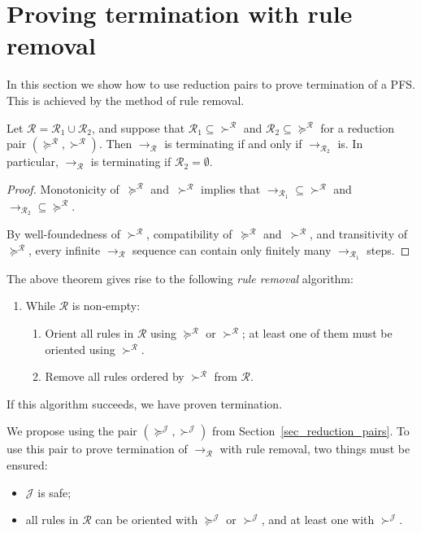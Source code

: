 \documentclass[a4paper,UKenglish,cleveref,autoref,numberwithinsect]{lipics-v2019}
\theoremstyle{definition}
\newcommand{\Rules}{\mathcal{R}}
\newcommand{\arr}[1]{\longrightarrow_{#1}}
\newcommand{\Termmap}{\mathcal{J}}
\newcommand{\succinterpret}{\succ^{\Termmap}}
\newcommand{\succeqinterpret}{\succeq^{\Termmap}}
\begin{document}
\section{Proving termination with rule removal}\label{sec_rule_removal}

In this section we show how to use reduction pairs to prove
termination of a PFS. This is achieved by the method of rule removal.

\begin{theorem}\label{thm:ruleremove}
  Let $\Rules = \Rules_1 \cup \Rules_2$, and suppose that
  $\Rules_1\subseteq{\succ^\Rules}$ and
  $\Rules_2\subseteq{\succeq^\Rules}$ for a reduction pair
  $(\succeq^\Rules,\succ^\Rules)$. Then $\arr{\Rules}$ is terminating
  if and only if $\arr{\Rules_2}$ is. In particular, $\arr{\Rules}$ is
  terminating if $\Rules_2 = \emptyset$.
\end{theorem}

\begin{proof}
  Monotonicity of~$\succeq^\Rules$ and~$\succ^\Rules$ implies that
  ${\arr{\Rules_1}}\subseteq{\succ^\Rules}$ and
  ${\arr{\Rules_2}}\subseteq{\succeq^\Rules}$.

  By well-foundedness of $\succ^\Rules$, compatibility
  of~$\succeq^\Rules$ and~$\succ^\Rules$, and transitivity
  of~$\succeq^\Rules$, every infinite $\arr{\Rules}$ sequence can
  contain only finitely many $\arr{\Rules_1}$ steps.
\end{proof}

The above theorem gives rise to the following \emph{rule removal}
algorithm:
\begin{enumerate}
\item While $\Rules$ is non-empty:
  \begin{enumerate}
  \item Orient all rules in $\Rules$ using $\succeq^\Rules$ or
    $\succ^\Rules$; at least one of them must be oriented using
    $\succ^\Rules$.
  \item Remove all rules ordered by $\succ^\Rules$ from $\Rules$.
  \end{enumerate}
\end{enumerate}
If this algorithm succeeds, we have proven termination.

We propose using the pair $(\succeqinterpret,\succinterpret)$ from
Section~\ref{sec_reduction_pairs}. To use this pair to prove
termination of $\arr{\Rules}$ with rule removal, two things must be
ensured:
\begin{itemize}
\item $\Termmap$ is safe;
\item all rules in $\Rules$ can be oriented with $\succeqinterpret$ or
  $\succinterpret$, and at least one with $\succinterpret$.
\end{itemize}
\end{document}
